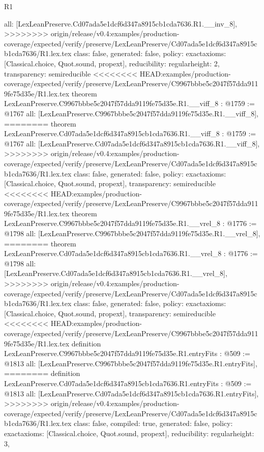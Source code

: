 \begin{lexlean}{R1}
\begin{coremodule}
{{{{{{{{{{{{  all: [LexLeanPreserve.Cd07ada5e1dcf6d347a8915cb1cda7636.R1.__inv_8],
>>>>>>>> origin/release/v0.4:examples/production-coverage/expected/verify/preserve/LexLeanPreserve/Cd07ada5e1dcf6d347a8915cb1cda7636/R1.lex.tex
  class: false,
  generated: false,
  policy: exact{axioms: [Classical.choice, Quot.sound, propext]},
  reducibility: regular{height: 2},
  transparency: semireducible
}
<<<<<<<< HEAD:examples/production-coverage/expected/verify/preserve/LexLeanPreserve/C9967bbbe5c2047f57dda9119fe75d35e/R1.lex.tex
theorem LexLeanPreserve.C9967bbbe5c2047f57dda9119fe75d35e.R1.__viff_8 : @1759 := @1767 {
  all: [LexLeanPreserve.C9967bbbe5c2047f57dda9119fe75d35e.R1.__viff_8],
========
theorem LexLeanPreserve.Cd07ada5e1dcf6d347a8915cb1cda7636.R1.__viff_8 : @1759 := @1767 {
  all: [LexLeanPreserve.Cd07ada5e1dcf6d347a8915cb1cda7636.R1.__viff_8],
>>>>>>>> origin/release/v0.4:examples/production-coverage/expected/verify/preserve/LexLeanPreserve/Cd07ada5e1dcf6d347a8915cb1cda7636/R1.lex.tex
  class: false,
  generated: false,
  policy: exact{axioms: [Classical.choice, Quot.sound, propext]},
  transparency: semireducible
}
<<<<<<<< HEAD:examples/production-coverage/expected/verify/preserve/LexLeanPreserve/C9967bbbe5c2047f57dda9119fe75d35e/R1.lex.tex
theorem LexLeanPreserve.C9967bbbe5c2047f57dda9119fe75d35e.R1.__vrel_8 : @1776 := @1798 {
  all: [LexLeanPreserve.C9967bbbe5c2047f57dda9119fe75d35e.R1.__vrel_8],
========
theorem LexLeanPreserve.Cd07ada5e1dcf6d347a8915cb1cda7636.R1.__vrel_8 : @1776 := @1798 {
  all: [LexLeanPreserve.Cd07ada5e1dcf6d347a8915cb1cda7636.R1.__vrel_8],
>>>>>>>> origin/release/v0.4:examples/production-coverage/expected/verify/preserve/LexLeanPreserve/Cd07ada5e1dcf6d347a8915cb1cda7636/R1.lex.tex
  class: false,
  generated: false,
  policy: exact{axioms: [Classical.choice, Quot.sound, propext]},
  transparency: semireducible
}
<<<<<<<< HEAD:examples/production-coverage/expected/verify/preserve/LexLeanPreserve/C9967bbbe5c2047f57dda9119fe75d35e/R1.lex.tex
definition LexLeanPreserve.C9967bbbe5c2047f57dda9119fe75d35e.R1.entryFits : @509 := @1813 {
  all: [LexLeanPreserve.C9967bbbe5c2047f57dda9119fe75d35e.R1.entryFits],
========
definition LexLeanPreserve.Cd07ada5e1dcf6d347a8915cb1cda7636.R1.entryFits : @509 := @1813 {
  all: [LexLeanPreserve.Cd07ada5e1dcf6d347a8915cb1cda7636.R1.entryFits],
>>>>>>>> origin/release/v0.4:examples/production-coverage/expected/verify/preserve/LexLeanPreserve/Cd07ada5e1dcf6d347a8915cb1cda7636/R1.lex.tex
  class: false,
  compiled: true,
  generated: false,
  policy: exact{axioms: [Classical.choice, Quot.sound, propext]},
  reducibility: regular{height: 3},
}}}}}}}}}}}}}}}
\end{coremodule}
\end{lexlean}
